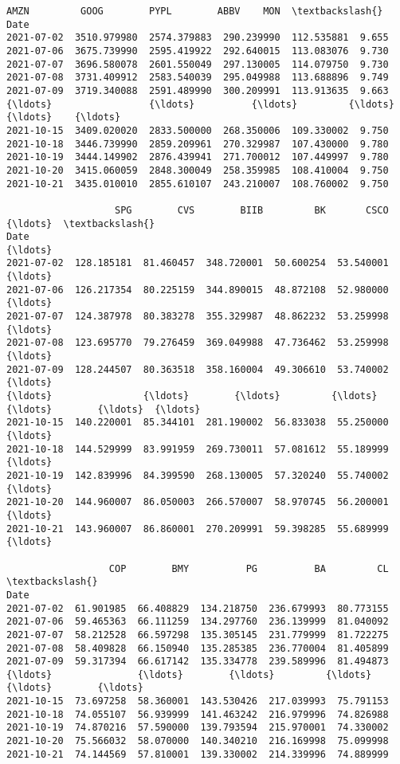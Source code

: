 \documentclass[11pt]{article}
\makeatletter
\newcommand{\boxspacing}{\kern\kvtcb@left@rule\kern\kvtcb@boxsep}
\newcommand{\prompt}[4]{
        {\ttfamily\llap{{\color{#2}[#3]:\hspace{3pt}#4}}\vspace{-\baselineskip}}
    }
\makeatother
\begin{document}
            \begin{tcolorbox}[breakable, size=fbox, boxrule=.5pt, pad at break*=1mm, opacityfill=0]
\prompt{Out}{outcolor}{6}{\boxspacing}
\begin{Verbatim}[commandchars=\\\{\}]
                   AMZN         GOOG        PYPL        ABBV    MON  \textbackslash{}
Date
2021-07-02  3510.979980  2574.379883  290.239990  112.535881  9.655
2021-07-06  3675.739990  2595.419922  292.640015  113.083076  9.730
2021-07-07  3696.580078  2601.550049  297.130005  114.079750  9.730
2021-07-08  3731.409912  2583.540039  295.049988  113.688896  9.749
2021-07-09  3719.340088  2591.489990  300.209991  113.913635  9.663
{\ldots}                 {\ldots}          {\ldots}         {\ldots}         {\ldots}    {\ldots}
2021-10-15  3409.020020  2833.500000  268.350006  109.330002  9.750
2021-10-18  3446.739990  2859.209961  270.329987  107.430000  9.780
2021-10-19  3444.149902  2876.439941  271.700012  107.449997  9.780
2021-10-20  3415.060059  2848.300049  258.359985  108.410004  9.750
2021-10-21  3435.010010  2855.610107  243.210007  108.760002  9.750

                   SPG        CVS        BIIB         BK       CSCO  {\ldots}  \textbackslash{}
Date                                                                 {\ldots}
2021-07-02  128.185181  81.460457  348.720001  50.600254  53.540001  {\ldots}
2021-07-06  126.217354  80.225159  344.890015  48.872108  52.980000  {\ldots}
2021-07-07  124.387978  80.383278  355.329987  48.862232  53.259998  {\ldots}
2021-07-08  123.695770  79.276459  369.049988  47.736462  53.259998  {\ldots}
2021-07-09  128.244507  80.363518  358.160004  49.306610  53.740002  {\ldots}
{\ldots}                {\ldots}        {\ldots}         {\ldots}        {\ldots}        {\ldots}  {\ldots}
2021-10-15  140.220001  85.344101  281.190002  56.833038  55.250000  {\ldots}
2021-10-18  144.529999  83.991959  269.730011  57.081612  55.189999  {\ldots}
2021-10-19  142.839996  84.399590  268.130005  57.320240  55.740002  {\ldots}
2021-10-20  144.960007  86.050003  266.570007  58.970745  56.200001  {\ldots}
2021-10-21  143.960007  86.860001  270.209991  59.398285  55.689999  {\ldots}

                  COP        BMY          PG          BA         CL  \textbackslash{}
Date
2021-07-02  61.901985  66.408829  134.218750  236.679993  80.773155
2021-07-06  59.465363  66.111259  134.297760  236.139999  81.040092
2021-07-07  58.212528  66.597298  135.305145  231.779999  81.722275
2021-07-08  58.409828  66.150940  135.285385  236.770004  81.405899
2021-07-09  59.317394  66.617142  135.334778  239.589996  81.494873
{\ldots}               {\ldots}        {\ldots}         {\ldots}         {\ldots}        {\ldots}
2021-10-15  73.697258  58.360001  143.530426  217.039993  75.791153
2021-10-18  74.055107  56.939999  141.463242  216.979996  74.826988
2021-10-19  74.870216  57.590000  139.793594  215.970001  74.330002
2021-10-20  75.566032  58.070000  140.340210  216.169998  75.099998
2021-10-21  74.144569  57.810001  139.330002  214.339996  74.889999


\end{Verbatim}
\end{tcolorbox}
\end{document}
